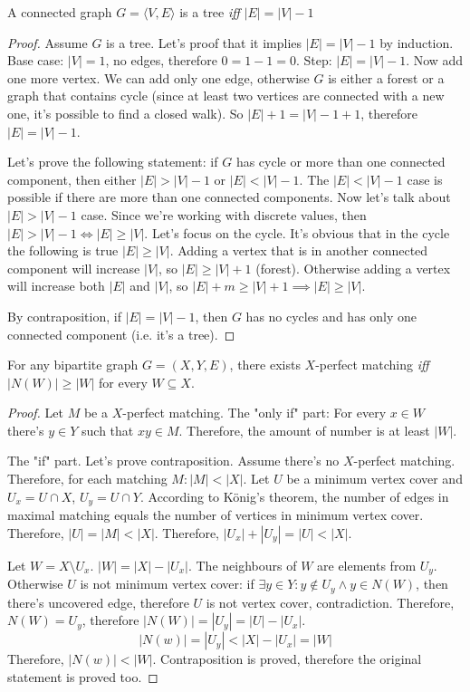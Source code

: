 \documentclass[12pt, a4paper]{article}
\begin{document}
\begin{theorem}[Tree]
A connected graph \(G = \langle V, E \rangle\) is a tree \textit{iff} \(|E| = |V| - 1\)
\end{theorem}

\begin{proof}
Assume \(G\) is a tree. Let's proof that it implies \(|E| = |V| - 1\) by
induction. Base case: \(|V| = 1\), no edges, therefore \(0 = 1 - 1 = 0\). Step:
\(|E| = |V| - 1\). Now add one more vertex. We can add only one edge, otherwise
\(G\) is either a forest or a graph that contains cycle (since at least two
vertices are connected with a new one, it's possible to find a closed walk). So
\(|E| + 1 = |V| - 1 + 1\), therefore \(|E| = |V| - 1\).

Let's prove the following statement: if \(G\) has cycle or more than one
  connected component, then either \(|E| > |V| - 1\) or \(|E| < |V| - 1\).
The \(|E| < |V| - 1\) case is possible if there are more than one connected components.
Now let's talk about \(|E| > |V| - 1\) case. Since we're working with discrete values, then \(|E| > |V| - 1 \iff |E| \ge |V|\).
Let's focus on the cycle. It's obvious that in the cycle the following is true \(|E| \ge |V|\).
Adding a vertex that is in another connected component will increase \(|V|\), so \(|E| \ge |V| + 1\) (forest).
Otherwise adding a vertex will increase both \(|E|\) and \(|V|\), so \(|E| + m \ge |V| + 1 \implies |E| \ge |V|\).

By contraposition, if \(|E| = |V| - 1\), then \(G\) has no cycles and has only one connected component (i.e. it's a tree).
\end{proof}

\begin{theorem}[Hall]
For any bipartite graph \(G = (X, Y, E)\), there exists \(X\)-perfect matching
\textit{iff} \(|N(W)| \ge |W|\) for every \(W \subseteq X\).
\end{theorem}

\begin{proof}
Let \(M\) be a \(X\)-perfect matching.
The "only if" part: For every \(x \in W\) there's \(y \in Y\) such that \(xy \in M\).
Therefore, the amount of number is at least \(|W|\).

The "if" part. Let's prove contraposition.
Assume there's no \(X\)-perfect matching.
Therefore, for each matching \(M : |M| < |X|\).
Let \(U\) be a minimum vertex cover and \(U_x = U \cap X\), \(U_y = U \cap Y\).
According to K\"onig's theorem, the number of edges in maximal matching equals
the number of vertices in minimum vertex cover.
Therefore, \(|U| = |M| < |X|\). Therefore, \(|U_x| + |U_y| = |U| < |X|\).

Let \(W = X \setminus U_x\). \(|W| = |X| - |U_x|\).
The neighbours of \(W\) are elements from \(U_y\).
Otherwise \(U\) is not minimum vertex cover:
if \(\exists y \in Y : y \not\in U_y \land y \in N(W)\),
then there's uncovered edge, therefore \(U\) is not vertex cover, contradiction.
Therefore, \(N(W) = U_y\), therefore \(|N(W)| = |U_y| = |U| - |U_x|\).
\[|N(w)| = |U_y| < |X| - |U_x| = |W|\]
Therefore, \(|N(w)| < |W|\). Contraposition is proved, therefore
the original statement is proved too.
\end{proof}
\end{document}
